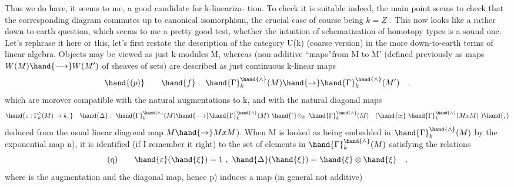 Thus we do have, it seems to me, a good candidate for k-lineariza-%
tion. To check it is suitable indeed, the main point seems to check
that the corresponding diagram  commutes up to canonical isomorphism,
the crucial case of course being $k=\underline{Z}$ . This now looks like a rather down
to earth question, which seems to me a pretty good test, whether the
intuition of schematization of homotopy types is a sound one. Let's
rephrase it here or this, let's first restate the 
description of the  category U(k) (coarse version) in the more
down-to-earth terms of linear algebra. Objects may be viewed as just
k-modules M, whereas  (non additive\hand{)} ``maps''from M to M' (defined
previously as maps $W(M)\hand{\longrightarrow} W(M')$ of sheaves of sets) are described as
just continuous k-linear maps
\[ \hand{(p)} \qquad \hand{f}:\ \hand{\Gamma}_k^{\hand{\wedge}}(M) \hand{\rightarrow} \hand{\Gamma}_k^{\hand{\wedge}}(M') \quad , \]
which are morover compatible with the natural augmentations to k,
and with the natural diagonal maps \hand{:}
\[ \hand{\varepsilon:\Gamma_k^{\wedge}(M)\rightarrow k,}\quad \hand{\Delta}:\ \hand{\Gamma}_k^{\hand{\wedge}}(M)\hand{\longrightarrow} \hand{\Gamma}_k^{\hand{\wedge}}(M)\ \hand{\hat{\ }}\!\otimes_k\ \hand{\Gamma}_k^{\hand{\wedge}}(M) \quad (\hand{\simeq}\ \hand{\Gamma}_k^{\hand{\wedge}}(MxM)\ )\hand{,} \]
 \deleted{(}deduced from the usual linear diagonal map $M\hand{\rightarrow} MxM$). When M is
looked  as being embedded in $\hand{\Gamma}_k^{\hand{\wedge}}(M)$ by the exponential map \hand{(}n),
it is identified (if I remember it right) to the set of elements \inserted{$\xi$} in
$\hand{\Gamma}_k^{\hand{\wedge}}(M)$ satisfying the relations
\[ \text{(q)} \qquad \hand{\varepsilon}(\hand{\xi}) = 1 \ ,\ \hand{\Delta}(\hand{\xi}) = \hand{\xi}\otimes\hand{\xi} \quad , \]
where \hand{$\varepsilon$} is the augmentation and \hand{$\Delta$} the diagonal map, hence p) induces
a map (in general not additive)


